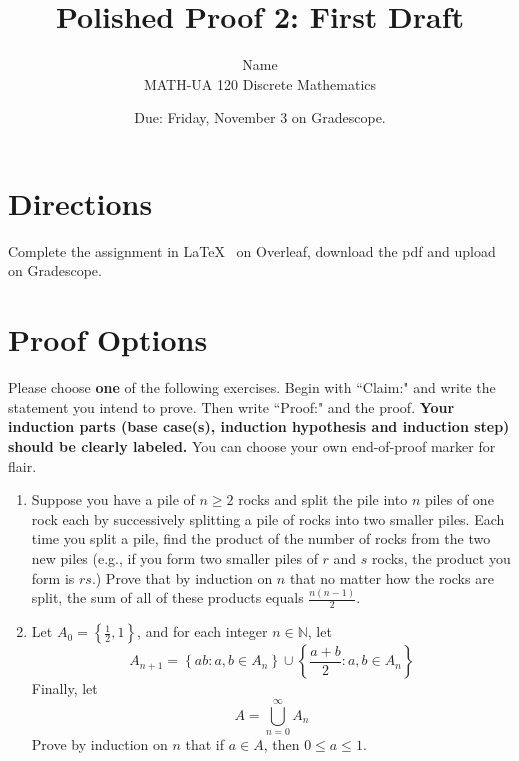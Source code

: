 \documentclass{article}
\title{Polished Proof 2: First Draft}
\author{%
	Name
	\\
	MATH-UA 120 Discrete Mathematics
}
\date{Due: Friday, November 3 on Gradescope.}
\theoremstyle{definition}
\begin{document}
	\maketitle
	
	\section*{Directions}

Complete the assignment in \LaTeX~  on Overleaf, download the pdf and upload on Gradescope.


\section*{Proof Options}

Please choose \textbf{one} of the following exercises. Begin with ``Claim:" and write the statement you intend to prove. Then write ``Proof:" and the proof. \textbf{Your induction parts (base case(s), induction hypothesis and induction step) should be clearly labeled.} You can choose your own end-of-proof marker for flair.

\begin{enumerate}
	\item 
    Suppose you have a pile of $n\geq 2$ rocks and split the pile into $n$ piles of one rock each by successively splitting a pile of rocks into two smaller piles. Each time you split a pile, find the product of the number of rocks from the two new piles (e.g., if you form two smaller piles of $r$ and $s$ rocks, the product you form is $rs$.) Prove that by induction on $n$ that no matter how the rocks are split, the sum of all of these products equals $\frac{n(n-1)}{2}$.

	\item
    Let $A_0 = \left\{\frac{1}{2},1\right\}$, and for each integer $n \in \mathbb{N}$, let 
    \[
        A_{n+1} = \left\{ab : a,b \in A_n\right\}
                    \cup \left\{\frac{a+b}{2} : a,b\in A_n \right\}
    \]
    Finally, let 
    \[
        A = \bigcup_{n=0}^\infty A_n
    \]
    Prove by induction on $n$ that if $a\in A$, then $0\leq a\leq 1$.

\end{enumerate}
\end{document}
